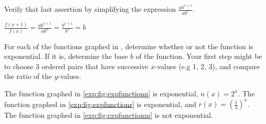 \begin{exercises}
\begin{problem}
\begin{subproblem}
	Verify that last assertion by simplifying the expression $\frac{ab^{x+1}}{ab^x}$.
	\begin{shortsolution}
		$\displaystyle\frac{f(x+1)}{f(x)}=\frac{ab^{x+1}}{ab^x}=\frac{b^{x+1}}{b^x}=b$
	\end{shortsolution}
\end{subproblem}
\begin{subproblem}\label{exp:prob:exponentialgraphs}
	For each of the functions graphed in , 
	determine whether or not the function is exponential.  If it is, determine the base $b$ of the function. Your first step might be to choose 
	3 ordered pairs that have successive $x$-values (e.g 1, 2, 3), and compare the ratio of the $y$-values.
	\begin{shortsolution}
		The function graphed in \cref{exp:fig:expfunctionn} is exponential, $n(x)=2^x$.  
		The function graphed in \cref{exp:fig:expfunctionr} is exponential, and $r(x)=\left(\frac13\right)^x$.
		The function graphed in \cref{exp:fig:expfunctionm} is not exponential.  
	\end{shortsolution}
\end{subproblem}


\end{problem}
\end{exercises}
